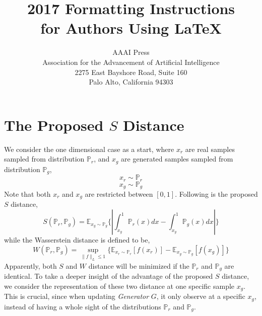 \documentclass[letterpaper]{article} %
\begin{document}
%
\title{2017 Formatting Instructions \\for Authors Using \LaTeX{}}
\author{AAAI Press\\
Association for the Advancement of Artificial Intelligence\\
2275 East Bayshore Road, Suite 160\\
Palo Alto, California 94303\\
}
\maketitle
\begin{abstract}
\end{abstract}

\section{The Proposed $S$ Distance}
We consider the one dimensional case as a start, where $x_{r}$ are real samples sampled from distribution $\mathbb{P}_{r}$, and $x_{g}$ are generated samples sampled from distribution $\mathbb{P}_{g}$,
\begin{equation}\label{x-r}
   x_{r} \sim \mathbb{P}_{r}
\end{equation}
\begin{equation}\label{x-g}
  x_{g} \sim \mathbb{P}_{g}
\end{equation}
Note that both $x_{r}$ and $x_{g}$ are restricted between $[0,1]$. Following is the proposed $S$ distance,
\begin{equation}\label{s-distance}
  S(\mathbb{P}_r,\mathbb{P}_g)=\mathbb{E}_{x_g \sim \mathbb{P}_g} \{ | \int_{x_g}^{1} \mathbb{P}_r(x) d x - \int_{x_g}^{1} \mathbb{P}_g(x) d x | \}
\end{equation}
while the Wasserstein distance is defined to be,
\begin{equation}\label{w-distance}
  W(\mathbb{P}_r,\mathbb{P}_g)=\sup_{\|f\|_L \leq 1} \{ \mathbb{E}_{x_r \sim \mathbb{P}_r} [f(x_r)] - \mathbb{E}_{x_g \sim \mathbb{P}_g} [f(x_g)] \}
\end{equation}
Apparently, both $S$ and $W$ distance will be minimized if the $\mathbb{P}_r$ and $\mathbb{P}_g$ are identical.
To take a deeper insight of the advantage of the proposed $S$ distance, we consider the representation of these two distance at one specific sample $x_g$.
This is crucial, since when updating \textit{Generator} $G$, it only observe at a specific $x_g$, instead of having a whole sight of the distributions $\mathbb{P}_r$ and $\mathbb{P}_g$.
\end{document}
